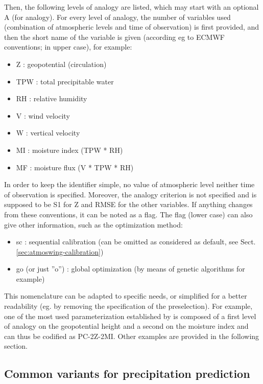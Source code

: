 \documentclass[review]{elsarticle}
\begin{document}
Then, the following levels of analogy are listed, which may start with an optional A (for analogy). For every level of analogy, the number of variables used (combination of atmospheric levels and time of observation) is first provided, and then the short name of the variable is given (according eg to ECMWF conventions; in upper case), for example:
\begin{itemize}
	\setlength\itemsep{-2px}
	\item Z : geopotential (circulation)
	\item TPW : total precipitable water
	\item RH : relative humidity
	\item V : wind velocity
	\item W : vertical velocity
	\item MI : moisture index (TPW * RH)
	\item MF : moisture flux (V * TPW * RH)
\end{itemize}

In order to keep the identifier simple, no value of atmospheric level neither time of observation is specified. Moreover, the analogy criterion is not specified and is supposed to be S1 for Z and RMSE for the other variables. If anything changes from these conventions, it can be noted as a flag. The flag (lower case) can also give other information, such as the optimization method:
\begin{itemize}
	\setlength\itemsep{-2px}
	\item sc : sequential calibration (can be omitted as considered as default, see Sect. \ref{sec:atmoswing-calibration})
	\item go (or just ''o'') : global optimization (by means of genetic algorithms for example)
\end{itemize}

This nomenclature can be adapted to specific needs, or simplified for a better readability (eg. by removing the specification of the preselection). For example, one of the most used parameterization established by \citet{Bontron2004} is composed of a first level of analogy on the geopotential height and a second on the moisture index and can thus be codified as PC-2Z-2MI. Other examples are provided in the following section.


\subsection{Common variants for precipitation prediction}
\label{sec:method:references}
\end{document}
